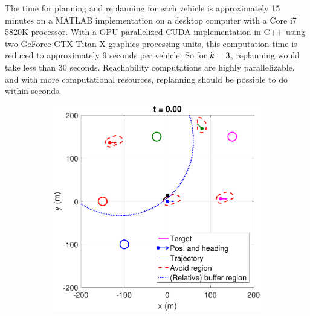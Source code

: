 The time for planning and replanning for each vehicle is approximately 15 minutes on a MATLAB implementation on a desktop computer with a Core i7 5820K processor. With a GPU-parallelized CUDA implementation in C++ using two GeForce GTX Titan X graphics processing units, this computation time is reduced to approximately 9 seconds per vehicle. So for $\bar{k} = 3$, replanning would take less than 30 seconds. Reachability computations are highly parallelizable, and with more computational resources, replanning should be possible to do within seconds.

\begin{figure}
\centering
\begin{subfigure}{.5\columnwidth}
  \centering
  \includegraphics[width=\columnwidth]{figs/simulate_bufferRegion_properties_normal_1}
  \subcaption{}
  \label{fig:normalcase1}
\end{subfigure}%
\begin{subfigure}{.5\columnwidth}
  \centering

\end{subfigure}
\end{figure}

